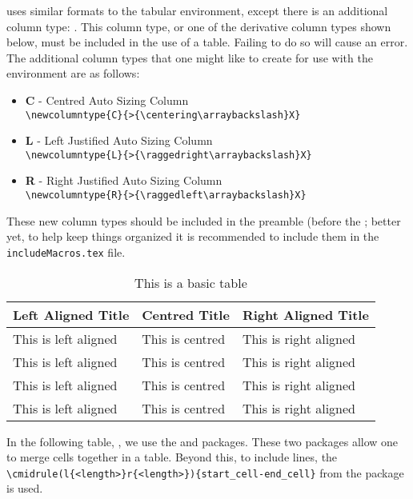 		 uses similar formats to the tabular environment, except there is an additional column type: .
		This column type, or one of the derivative column types shown below, must be included in the use of a  table. 
		Failing to do so will cause an error. The additional column types that one might like to create for use with the  environment are as follows:
		\begin{itemize}
			\item \textbf{C} - Centred Auto Sizing Column\\\lstinline|\newcolumntype{C}{>{\centering\arraybackslash}X}|
			\item \textbf{L} - Left Justified Auto Sizing Column \\\lstinline|\newcolumntype{L}{>{\raggedright\arraybackslash}X}|
			\item \textbf{R} - Right Justified Auto Sizing Column \\\lstinline|\newcolumntype{R}{>{\raggedleft\arraybackslash}X}|
		\end{itemize}
  		These new column types should be included in the preamble (before the \lstinline||; better yet, to help keep things organized it is recommended to include them in the \verb|includeMacros.tex| file.
		\begin{table}[H]
			\caption{This is a basic table}
			\label{tab:basicTable}
			\centering
			\begin{tabularx}{0.75\textwidth}{LCR} 
				\toprule
					\textbf{Left Aligned Title} & \textbf{Centred Title} & \textbf{Right Aligned Title} \\
				\midrule
					This is left aligned & This is centred & This is right aligned\\
					This is left aligned & This is centred & This is right aligned\\
					This is left aligned & This is centred & This is right aligned\\
					This is left aligned & This is centred & This is right aligned\\
				\bottomrule
			\end{tabularx}
		\end{table}
		In the following table, , we use the  and  packages.
		These two packages allow one to merge cells together in a table.
		Beyond this, to include lines, the \lstinline|\cmidrule(l{<length>}r{<length>}){start_cell-end_cell}| from the  package is used.
